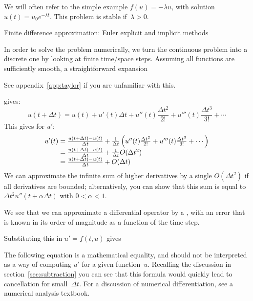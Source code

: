 We will often refer to the simple example
$f(u)=-\lambda u$, with solution $u(t)=u_0e^{-\lambda t}$. This
problem is stable if~$\lambda>0$.

 {Finite difference approximation: Euler explicit and implicit methods}
\label{sec:fd-ode}

In order to solve the problem numerically, we turn the continuous
problem into a discrete one by looking at finite time/space steps.
Assuming all functions are sufficiently smooth, a straightforward
 expansion
\begin{footnoteenv}
  {See appendix~\ref{app:taylor} 
    if you are unfamiliar with this.}
\end{footnoteenv}
gives:
\[ u(t+\Delta t)=u(t)+u'(t)\Delta t+u''(t)\frac{\Delta t^2}{2!}
+ u'''(t)\frac{\Delta t^3}{3!}+\cdots \]
This gives for $u'$:
\begin{equation}
  \begin{array}{r@{{}={}}l}
  u'(t) & \frac{u(t+\Delta t)-u(t)}{\Delta t}+\frac1{\Delta t}
                \left(u''(t)\frac{\Delta t^2}{2!}
                + u'''(t)\frac{\Delta t^3}{3!}+\cdots\right)\\
        & \frac{u(t+\Delta t)-u(t)}{\Delta t}+\frac1{\Delta t}O(\Delta t^2)\\
        & \frac{u(t+\Delta t)-u(t)}{\Delta t}+O(\Delta t)    
  \end{array}
  \label{eq:forwarddifference}\end{equation}
We can approximate the infinite sum of higher derivatives by a single
$O(\Delta t^2)$ if all derivatives are bounded; alternatively,
you can show that this sum is equal to $\Delta
t^2u''(t+\alpha\Delta t)$ with $0<\alpha<1$.

We see that we can approximate a differential operator by a
, with an error that is known in its
order of magnitude as a function of the time step.

Substituting this in $u'=f(t,u)$ gives
\begin{footnoteenv}
  {The following equation
  is a mathematical equality, and should not be interpreted as a way
  of computing $u'$ for a given function~$u$. Recalling the discussion
  in section~\ref{sec:subtraction} you can see that this formula would
  quickly lead to cancellation for small~$\Delta t$. For a discussion
  of numerical differentiation, see a numerical analysis textbook.}
\end{footnoteenv}

